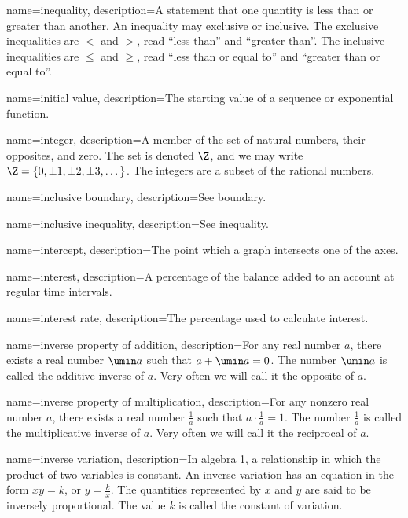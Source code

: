  {
	name=inequality,
	description={A statement that one quantity is less than or greater than another. An inequality may exclusive or inclusive. The exclusive inequalities are $<$ and $>$, read ``less than'' and ``greater than''. The inclusive inequalities are $\leq$ and $\geq$, read ``less than or equal to'' and ``greater than or equal to''.}
}

 {
	name=initial value,
	description={The starting value of a sequence or exponential function.}
}

 {
	name=integer,
	description={A member of the set of natural numbers, their opposites, and zero. The set is denoted $\Z$, and we may write $\Z = \{0, \pm1, \pm2, \pm3, \dotsc \}$. The integers are a subset of the rational numbers.}
}

 {
	name=inclusive boundary,
	description={See \gls{boundary}.}
}

 {
	name=inclusive inequality,
	description={See \gls{inequality}.}
}

 {
	name=intercept,
	description={The point which a graph intersects one of the axes.}
}

 {
	name=interest,
	description={A percentage of the balance added to an account at regular time intervals.}
}

 {
	name=interest rate,
	description={The percentage used to calculate interest.}
}

 {
	name=inverse property of addition,
	description={For any real number $a$, there exists a real number $\umin a$ such that $a + \umin a = 0$. The number $\umin a$ is called the \gls{additive inverse} of $a$. Very often we will call it the \gls{opposite} of $a$.}
}

 {
	name=inverse property of multiplication,
	description={For any nonzero real number $a$, there exists a real number $\frac{1}{a}$ such that $a \cdot \frac{1}{a} = 1$. The number $\frac{1}{a}$ is called the \gls{multiplicative inverse} of $a$. Very often we will call it the \gls{reciprocal} of $a$.}
}


 {
	name=inverse variation,
	description={In algebra 1, a relationship in which the product of two variables is constant. An inverse variation has an equation in the form $xy = k$, or $y = \frac{k}{x}$. The quantities represented by $x$ and $y$ are said to be \gls{inversely proportional}. The value $k$ is called the \gls{constant of variation}.}
}

